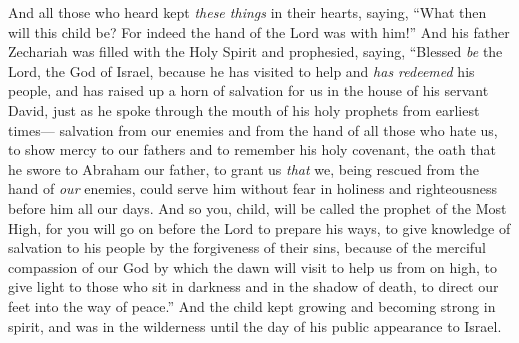 \begin{biblechapter}
\verse And all those who heard kept \textit{these things} in their hearts, saying, “What then will this child be? For indeed the hand of the Lord was with him!”
 And his father Zechariah was filled with the Holy Spirit and prophesied, saying,
\verse “Blessed \textit{be} the Lord, the God of Israel, 
because he has visited to help and \textit{has redeemed} his people,
\verse and has raised up a horn of salvation for us 
in the house of his servant David,
\verse just as he spoke through the mouth of his holy prophets from earliest times—
\verse salvation from our enemies and from the hand of all those who hate us,
\verse to show mercy to our fathers 
and to remember his holy covenant,
\verse the oath that he swore to Abraham our father, 
to grant us
\verse \textit{that} we, being rescued from the hand of \textit{our} enemies, 
could serve him without fear
\verse in holiness and righteousness 
before him all our days.
\verse And so you, child, will be called the prophet of the Most High, 
for you will go on before the Lord to prepare his ways,
\verse to give knowledge of salvation to his people 
by the forgiveness of their sins,
\verse because of the merciful compassion of our God 
by which the dawn will visit to help us from on high,
\verse to give light to those who sit in darkness and in the shadow of death, 
to direct our feet into the way of peace.”
\verse And the child kept growing and becoming strong in spirit, and was in the wilderness until the day of his public appearance to Israel.
\end{biblechapter}

